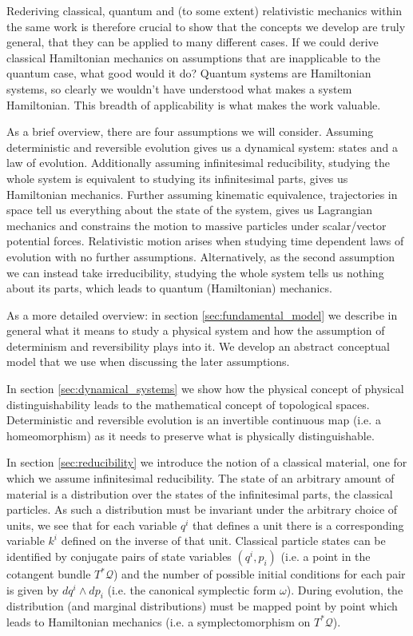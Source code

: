 \documentclass[smallextended]{svjour3}
\numberwithin{equation}{section}
\theoremstyle{definition}
\begin{document}
Rederiving classical, quantum and (to some extent) relativistic mechanics within the same work is therefore crucial to show that the concepts we develop are truly general, that they can be applied to many different cases. If we could derive classical Hamiltonian mechanics on assumptions that are inapplicable to the quantum case, what good would it do? Quantum systems are Hamiltonian systems, so clearly we wouldn't have understood what makes a system Hamiltonian. This breadth of applicability is what makes the work valuable.

As a brief overview, there are four assumptions we will consider. Assuming deterministic and reversible evolution gives us a dynamical system: states and a law of evolution. Additionally assuming infinitesimal reducibility, studying the whole system is equivalent to studying its infinitesimal parts, gives us Hamiltonian mechanics. Further assuming kinematic equivalence, trajectories in space tell us everything about the state of the system, gives us Lagrangian mechanics and constrains the motion to massive particles under scalar/vector potential forces. Relativistic motion arises when studying time dependent laws of evolution with no further assumptions. Alternatively, as the second assumption we can instead take irreducibility, studying the whole system tells us nothing about its parts, which leads to quantum (Hamiltonian) mechanics.

As a more detailed overview: in section \ref{sec:fundamental_model} we describe in general what it means to study a physical system and how the assumption of determinism and reversibility plays into it. We develop an abstract conceptual model that we use when discussing the later assumptions.

In section \ref{sec:dynamical_systems} we show how the physical concept of physical distinguishability leads to the mathematical concept of topological spaces. Deterministic and reversible evolution is an invertible continuous map (i.e. a homeomorphism) as it needs to preserve what is physically distinguishable.

In section \ref{sec:reducibility} we introduce the notion of a classical material, one for which we assume infinitesimal reducibility. The state of an arbitrary amount of material is a distribution over the states of the infinitesimal parts, the classical particles. As such a distribution must be invariant under the arbitrary choice of units, we see that for each variable $q^i$ that defines a unit there is a corresponding variable $k^i$ defined on the inverse of that unit. Classical particle states can be identified by conjugate pairs of state variables $(q^i, p_i)$ (i.e. a point in the cotangent bundle $T^*\mathcal{Q}$) and the number of possible initial conditions for each pair is given by $dq^i \wedge dp_i$ (i.e. the canonical symplectic form $\omega$). During evolution, the distribution (and marginal distributions) must be mapped point by point which leads to Hamiltonian mechanics (i.e. a symplectomorphism on $T^*\mathcal{Q}$).
\end{document}
